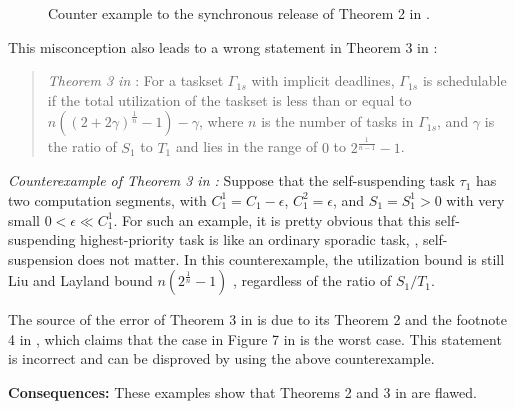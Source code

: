\begin{figure}[t]
{}     
  \caption{Counter example to the synchronous release of Theorem 2 in \cite{RTSS-KimANR13}.}
  \label{fig:counterexample-reduce-interf}
\end{figure}

This misconception also leads to a wrong statement in Theorem 3 in \cite{RTSS-KimANR13}:
\begin{quote}
{\it Theorem 3 in \cite{RTSS-KimANR13}}: For a taskset $\Gamma_{1s}$ with implicit deadlines, $\Gamma_{1s}$ is schedulable if the total utilization of the taskset is less than or equal to $n((2+2\gamma)^{\frac{1}{n}}-1)-\gamma$, where $n$ is the number of tasks in $\Gamma_{1s}$, and $\gamma$ is the ratio of
$S_1$ to $T_1$ and lies in the range of $0$ to $2^{\frac{1}{n-1}}-1$. 
\end{quote}


{\it Counterexample of Theorem 3 in \cite{RTSS-KimANR13}:} Suppose that the self-suspending task $\tau_1$ has two computation segments, with $C_1^1 = C_1-\epsilon$, $C_1^2 = \epsilon$, and $S_1=S_1^1 > 0$ with very small $0 < \epsilon \ll C_1^1$. For such an example, it is pretty obvious that this self-suspending highest-priority task is like an ordinary sporadic task, \ie, self-suspension does not matter. 
 In this counterexample, the utilization bound is still Liu and Layland bound $n(2^{\frac{1}{n}}-1)$ \cite{Liu_1973}, regardless of the ratio of $S_1/T_1$. 

The source of the error of Theorem 3 in \cite{RTSS-KimANR13} is due to its Theorem 2 and the footnote 4 in \cite{RTSS-KimANR13}, which claims that the case in Figure 7 in \cite{RTSS-KimANR13} is the worst case. This statement is incorrect and can be disproved by using the above counterexample. 


{\bf Consequences:} These examples show that Theorems 2 and 3 in \cite{RTSS-KimANR13} are flawed.  

